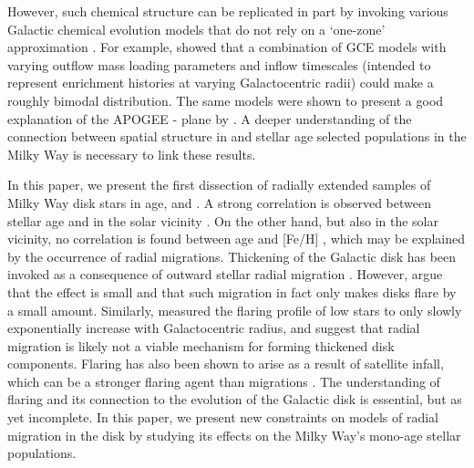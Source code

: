 However, such chemical structure can be replicated in part by invoking various Galactic chemical evolution models that do not rely on a `one-zone' approximation \citep[e.g.][]{1997ApJ...477..765C,2000A&A...355..929P,2016arXiv160408613A,2016arXiv160407435W}. For example, \citet{2016arXiv160408613A} showed that a combination of GCE models with varying outflow mass loading parameters and inflow timescales (intended to represent enrichment histories at varying Galactocentric radii) could make a roughly bimodal \afe{} distribution. The same models were shown to present a good explanation of the APOGEE \afe{}-\feh{} plane by \citet{2014ApJ...796...38N}. A deeper understanding of the connection between spatial structure in \afe{} and stellar age selected populations in the Milky Way is necessary to link these results. 

In this paper, we present the first dissection of radially extended samples of Milky Way disk stars in age, \feh{} and \afe{}. A strong correlation is observed between stellar age and \afe{} in the solar vicinity \citep{2013A&A...560A.109H}. On the other hand, but also in the solar vicinity, no correlation is found between age and [Fe/H] \citep[e.g.][]{1993A&A...275..101E,2004A&A...418..989N}, which may be explained by the occurrence of radial migrations. Thickening of the Galactic disk has been invoked as a consequence of outward stellar radial migration \citep[e.g.][]{2009MNRAS.399.1145S}. However, \citet{2012A&A...548A.127M} argue that the effect is small and that such migration in fact only makes disks flare by a small amount. Similarly, \citet{2016ApJ...823...30B} measured the flaring profile of low \afe{} stars to only slowly exponentially increase with Galactocentric radius, and suggest that radial migration is likely not a viable mechanism for forming thickened disk components. Flaring has also been shown to arise as a result of satellite infall, which can be a stronger flaring agent than migrations \citep[e.g.][]{2009ApJ...707L...1B}. The understanding of flaring and its connection to the evolution of the Galactic disk is essential, but as yet incomplete. In this paper, we present new constraints on models of radial migration in the disk by studying its effects on the Milky Way's mono-age stellar populations. 

